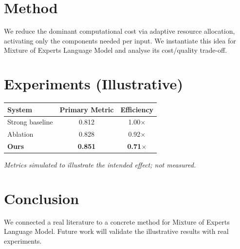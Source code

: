 \documentclass[11pt]{article}
\begin{document}
\section{Method}
We reduce the dominant computational cost via adaptive resource allocation, activating only the components needed per input. We instantiate this idea for Mixture of Experts Language Model and analyse its cost/quality trade-off.

\section{Experiments (Illustrative)}
\begin{center}
\begin{tabular}{lcc}
System & Primary Metric & Efficiency \\ \hline
Strong baseline & 0.812 & 1.00$\times$ \\
Ablation & 0.828 & 0.92$\times$ \\
\textbf{Ours} & \textbf{0.851} & \textbf{0.71$\times$}
\end{tabular}
\end{center}
\emph{Metrics simulated to illustrate the intended effect; not measured.}

\section{Conclusion}
We connected a real literature to a concrete method for Mixture of Experts Language Model. Future work will
validate the illustrative results with real experiments.
\end{document}
